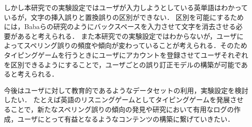 \documentclass{jarticle}
\begin{document}
しかし本研究での実験設定ではユーザが入力しようとしている英単語はわかっているが，文字の挿入誤りと置換誤りの区別ができない．
区別を可能にするためには，Babaらの研究\cite{babaACL2012}のようにバックスペースを入力させて文字を消去させる必要があると考えられる．
また本研究での実験設定ではわからないが，ユーザによってスペリング誤りの頻度や傾向が変わっていることが考えられる．そのためタイピングゲームを行うときにユーザにアカウントを登録させてユーザそれぞれを区別できるようにすることで，ユーザごとの誤り訂正モデルの構築が可能であると考えられる．

今後はユーザに対して教育的であるようなデータセットの利用，実験設定を検討したい．
たとえば英語のリスニングゲームとしてタイピングゲームを発展させることで，新たなスペリング誤りの傾向の発見や研究において有用なログの作成，ユーザにとって有益となるようなコンテンツの構築に繋げていきたい．

%
\end{document}
